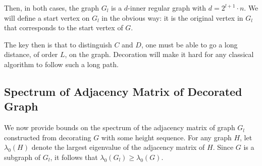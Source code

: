 \documentclass[letterpaper,onecolumn]{quantumarticle}
\begin{document}
Then, in both cases,
the graph $G_l$ is a $d$-inner regular graph with $d=2^{l+1} \cdot n$.
We will define a start vertex on $G_l$ in the obvious way: it is the original vertex in $G_l$ that corresponds to the start vertex of $G$.


The key then is that to distinguish $C$ and $D$, one must be able to go a long distance, of order $L$, on the graph.  Decoration will make it hard for any classical algorithm to follow such a long path.  


\subsection{Spectrum of Adjacency Matrix of Decorated Graph}
\label{spec}
We now provide bounds on the spectrum of the adjacency matrix of graph $G_l$ constructed from decorating $G$ with some height sequence.  For any graph $H$, let $\lambda_{0}(H)$ denote the largest eigenvalue of the adjacency matrix of $H$.  Since $G$ is a subgraph of $G_l$, it follows that $\lambda_0(G_l)\geq \lambda_0(G)$.
\end{document}
